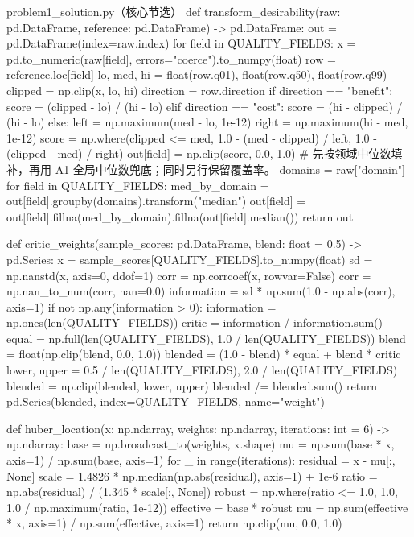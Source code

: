 \documentclass[bwprint]{gmcmthesis}
\numberwithin{equation}{section}
\numberwithin{figure}{section}
\numberwithin{table}{section}
\begin{document}
\begin{appendices}
\begin{Python}{problem1\_solution.py（核心节选）}
def transform_desirability(raw: pd.DataFrame, reference: pd.DataFrame) -> pd.DataFrame:
    out = pd.DataFrame(index=raw.index)
    for field in QUALITY_FIELDS:
        x = pd.to_numeric(raw[field], errors="coerce").to_numpy(float)
        row = reference.loc[field]
        lo, med, hi = float(row.q01), float(row.q50), float(row.q99)
        clipped = np.clip(x, lo, hi)
        direction = row.direction
        if direction == "benefit":
            score = (clipped - lo) / (hi - lo)
        elif direction == "cost":
            score = (hi - clipped) / (hi - lo)
        else:
            left = np.maximum(med - lo, 1e-12)
            right = np.maximum(hi - med, 1e-12)
            score = np.where(clipped <= med, 1.0 - (med - clipped) / left,
                             1.0 - (clipped - med) / right)
        out[field] = np.clip(score, 0.0, 1.0)
    # 先按领域中位数填补，再用 A1 全局中位数兜底；同时另行保留覆盖率。
    domains = raw["domain"]
    for field in QUALITY_FIELDS:
        med_by_domain = out[field].groupby(domains).transform("median")
        out[field] = out[field].fillna(med_by_domain).fillna(out[field].median())
    return out


def critic_weights(sample_scores: pd.DataFrame, blend: float = 0.5) -> pd.Series:
    x = sample_scores[QUALITY_FIELDS].to_numpy(float)
    sd = np.nanstd(x, axis=0, ddof=1)
    corr = np.corrcoef(x, rowvar=False)
    corr = np.nan_to_num(corr, nan=0.0)
    information = sd * np.sum(1.0 - np.abs(corr), axis=1)
    if not np.any(information > 0):
        information = np.ones(len(QUALITY_FIELDS))
    critic = information / information.sum()
    equal = np.full(len(QUALITY_FIELDS), 1.0 / len(QUALITY_FIELDS))
    blend = float(np.clip(blend, 0.0, 1.0))
    blended = (1.0 - blend) * equal + blend * critic
    lower, upper = 0.5 / len(QUALITY_FIELDS), 2.0 / len(QUALITY_FIELDS)
    blended = np.clip(blended, lower, upper)
    blended /= blended.sum()
    return pd.Series(blended, index=QUALITY_FIELDS, name="weight")


def huber_location(x: np.ndarray, weights: np.ndarray, iterations: int = 6) -> np.ndarray:
    base = np.broadcast_to(weights, x.shape)
    mu = np.sum(base * x, axis=1) / np.sum(base, axis=1)
    for _ in range(iterations):
        residual = x - mu[:, None]
        scale = 1.4826 * np.median(np.abs(residual), axis=1) + 1e-6
        ratio = np.abs(residual) / (1.345 * scale[:, None])
        robust = np.where(ratio <= 1.0, 1.0, 1.0 / np.maximum(ratio, 1e-12))
        effective = base * robust
        mu = np.sum(effective * x, axis=1) / np.sum(effective, axis=1)
    return np.clip(mu, 0.0, 1.0)



\end{Python}
\end{appendices}
\end{document}
